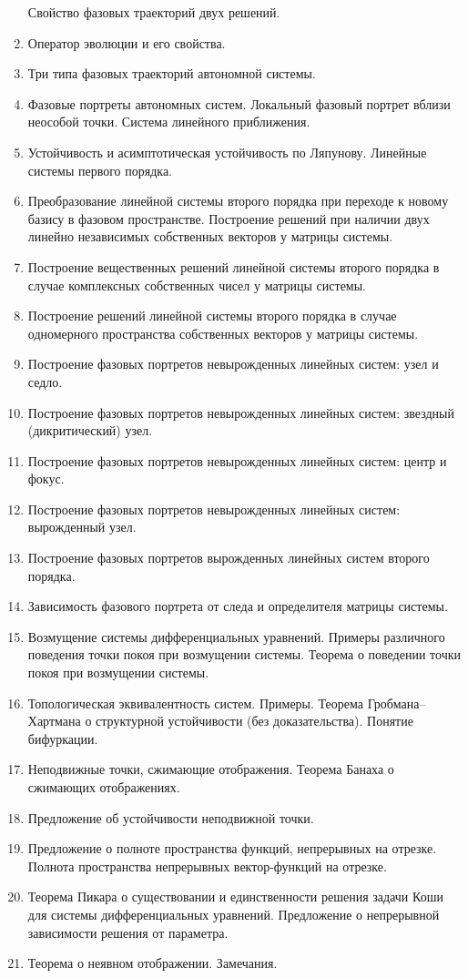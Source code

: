 \documentclass[a4paper,10pt]{article}
\begin{document}
\begin{enumerate}
        Свойство фазовых траекторий двух решений.
  \item Оператор эволюции и его свойства.
  \item Три типа фазовых траекторий автономной системы.
  \item Фазовые портреты автономных систем.
        Локальный фазовый портрет вблизи неособой точки.
        Система линейного приближения.
  \item Устойчивость и асимптотическая устойчивость по Ляпунову.
        Линейные системы первого порядка.
  \item Преобразование линейной системы второго порядка при переходе к новому базису в фазовом пространстве.
        Построение решений при наличии двух линейно независимых собственных векторов у матрицы системы.
  \item Построение вещественных решений линейной системы второго порядка в случае комплексных собственных чисел у матрицы системы.
  \item Построение решений линейной системы второго порядка в случае одномерного пространства собственных векторов у матрицы системы.
  \item Построение фазовых портретов невырожденных линейных систем: узел и седло.
  \item Построение фазовых портретов невырожденных линейных систем: звездный (дикритический) узел.
  \item Построение фазовых портретов невырожденных линейных систем: центр и фокус.
  \item Построение фазовых портретов невырожденных линейных систем: вырожденный узел.
  \item Построение фазовых портретов вырожденных линейных систем второго порядка.
  \item Зависимость фазового портрета от следа и определителя матрицы системы.
  \item Возмущение системы дифференциальных уравнений.
        Примеры различного поведения точки покоя при возмущении системы.
        Теорема о поведении точки покоя при возмущении системы.
  \item Топологическая эквивалентность систем.
        Примеры.
        Теорема Гробмана--Хартмана о структурной устойчивости (без доказательства).
        Понятие бифуркации.
  \item Неподвижные точки, сжимающие отображения.
        Теорема Банаха о сжимающих отображениях.
  \item Предложение об устойчивости неподвижной точки.
  \item Предложение о полноте пространства функций, непрерывных на отрезке.
        Полнота пространства непрерывных вектор-функций на отрезке.
  \item Теорема Пикара о существовании и единственности решения задачи Коши для системы дифференциальных уравнений.
        Предложение о непрерывной зависимости решения от параметра.
  \item Теорема о неявном отображении.
        Замечания.

\end{enumerate}
\end{document}
